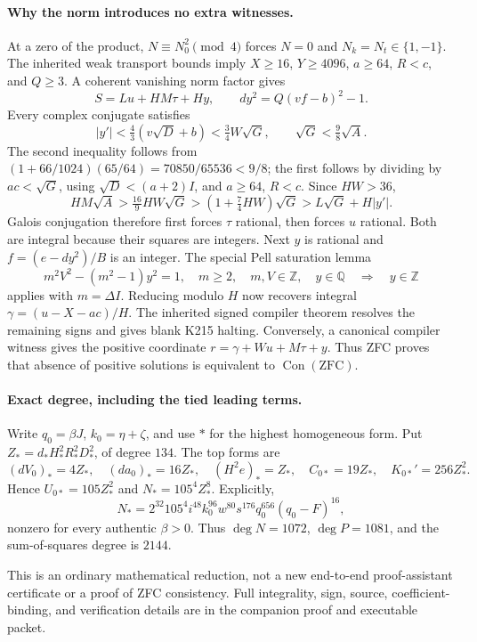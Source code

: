 \paragraph{Why the norm introduces no extra witnesses.}
At a zero of the product, $N\equiv N_0^2\pmod4$ forces $N=0$ and
$N_k=N_t\in\{1,-1\}$. The inherited weak transport bounds imply
$X\ge16$, $Y\ge4096$, $a\ge64$, $R<c$, and $Q\ge3$. A coherent
vanishing norm factor gives
\[
 S=Lu+HM\tau+Hy,\qquad d y^2=Q(vf-b)^2-1.
\]
Every complex conjugate satisfies
\[
 |y'|<\tfrac43(v\sqrt D+b)<\tfrac34W\sqrt G,
 \qquad \sqrt G<\tfrac98\sqrt A.
\]
The second inequality follows from
$(1+66/1024)(65/64)=70850/65536<9/8$; the first follows by dividing
by $ac<\sqrt G$, using $\sqrt D<(a+2)I$, and $a\ge64$, $R<c$.
Since $HW>36$,
\[
 HM\sqrt A>\tfrac{16}{9}HW\sqrt G
  >(1+\tfrac74HW)\sqrt G>L\sqrt G+H|y'|.
\]
Galois conjugation therefore first forces $\tau$ rational, then forces $u$
rational. Both are integral because their squares are integers. Next $y$ is
rational and $f=(e-dy^2)/B$ is an integer. The special Pell saturation lemma
\[
 m^2V^2-(m^2-1)y^2=1,\quad m\ge2,\quad m,V\in\mathbb Z,
 \quad y\in\mathbb Q\quad\Longrightarrow\quad y\in\mathbb Z
\]
applies with $m=\Delta I$. Reducing modulo $H$ now recovers integral
$\gamma=(u-X-ac)/H$. The inherited signed compiler theorem resolves the
remaining signs and gives blank K215 halting. Conversely, a canonical
compiler witness gives the positive coordinate
$r=\gamma+Wu+M\tau+y$. Thus ZFC proves that absence of positive solutions
is equivalent to $\operatorname{Con}(\mathrm{ZFC})$.

\paragraph{Exact degree, including the tied leading terms.}
Write $q_0=\beta J$, $k_0=\eta+\zeta$, and use $*$ for the highest
homogeneous form. Put $Z_*=d_*H_*^2R_*^2D_*^2$, of degree $134$.
The top forms are
\[
 (dV_0)_*=4Z_*,\quad(da_0)_*=16Z_*,\quad(H^2e)_*=Z_*,
 \quad C_{0*}=19Z_*,\quad K_{0*}'=256Z_*^2.
\]
Hence $U_{0*}=105Z_*^2$ and $N_*=105^4Z_*^8$. Explicitly,
\[
 N_*=2^{32}105^4i^{48}k_0^{96}w^{80}s^{176}
       q_0^{656}(q_0-F)^{16},
\]
nonzero for every authentic $\beta>0$. Thus $\deg N=1072$,
$\deg P=1081$, and the sum-of-squares degree is $2144$.

This is an ordinary mathematical reduction, not a new end-to-end
proof-assistant certificate or a proof of ZFC consistency. Full integrality,
sign, source, coefficient-binding, and verification details are in the
companion proof and executable packet.
